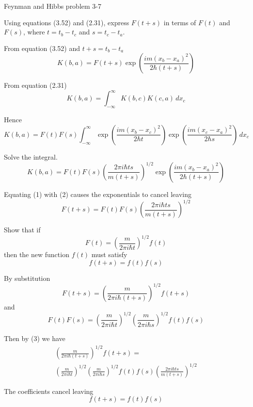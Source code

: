 \documentclass[12pt]{article}
\begin{document}
\begin{center}
Feynman and Hibbs problem 3-7
\end{center}

Using equations (3.52) and (2.31),
express $F(t+s)$ in terms of $F(t)$ and $F(s)$,
where $t=t_b-t_c$ and $s=t_c-t_a$.

\bigskip
From equation (3.52) and $t+s=t_b-t_a$
\begin{equation*}
K(b,a)=F(t+s)\exp\left(\frac{im(x_b-x_a)^2}{2\hbar (t+s)}\right)
\tag{1}
\end{equation*}

From equation (2.31)
\begin{equation*}
K(b,a)=\int_{-\infty}^\infty K(b,c)K(c,a)\,dx_c
\end{equation*}

Hence
\begin{equation*}
K(b,a)=F(t)F(s)\int_{-\infty}^\infty
\exp\left(\frac{im(x_b-x_c)^2}{2\hbar t}\right)
\exp\left(\frac{im(x_c-x_a)^2}{2\hbar s}\right)
\,dx_c
\end{equation*}

Solve the integral.
\begin{equation*}
K(b,a)=F(t)F(s)
\left(\frac{2\pi i\hbar ts}{m(t+s)}\right)^{1/2}
\exp\left(\frac{im(x_b-x_a)^2}{2\hbar(t+s)}\right)
\tag{2}
\end{equation*}

Equating (1) with (2) causes the exponentials to cancel leaving
\begin{equation*}
F(t+s)=F(t)F(s)\left(\frac{2\pi i\hbar ts}{m(t+s)}\right)^{1/2}
\tag{3}
\end{equation*}

Show that if
\begin{equation*}
F(t)=\left(\frac{m}{2\pi i\hbar t}\right)^{1/2} f(t)
\end{equation*}
then the new function $f(t)$ must satisfy
\begin{equation*}
f(t+s)=f(t)f(s)
\end{equation*}

By substitution
\begin{equation*}
F(t+s)=\left(\frac{m}{2\pi i\hbar (t+s)}\right)^{1/2} f(t+s)
\end{equation*}
and
\begin{equation*}
F(t)F(s)=
\left(\frac{m}{2\pi i\hbar t}\right)^{1/2}
\left(\frac{m}{2\pi i\hbar s}\right)^{1/2}
f(t)f(s)
\end{equation*}

Then by (3) we have
\begin{multline*}
\left(\frac{m}{2\pi i\hbar(t+s)}\right)^{1/2}
f(t+s)=
\\
\left(\frac{m}{2\pi i\hbar t}\right)^{1/2}
\left(\frac{m}{2\pi i\hbar s}\right)^{1/2}
f(t)f(s)
\left(\frac{2\pi i\hbar ts}{m(t+s)}\right)^{1/2}
\end{multline*}

The coefficients cancel leaving
\begin{equation*}
f(t+s)=f(t)f(s)
\tag{4}
\end{equation*}
\end{document}
